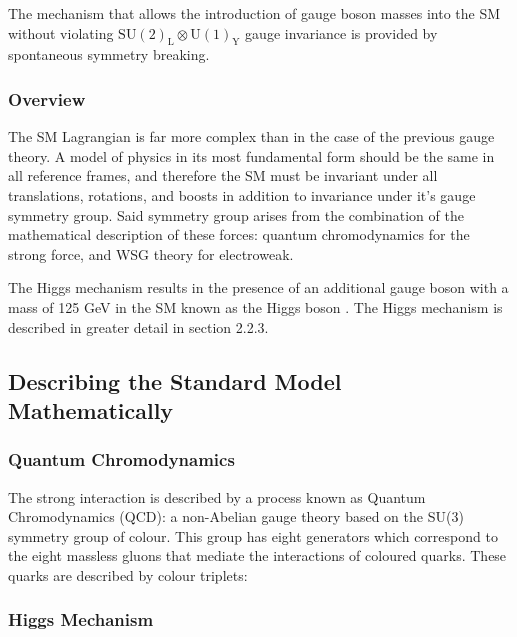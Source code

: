 \documentclass[12pt,a4paper,epsf,portrait,times,epsfig]{report}
\begin{document}
	The mechanism that allows the introduction of gauge boson masses into the SM without violating $\mathrm{SU(2)}_{\mathrm{L}} \otimes \mathrm{U(1)}_{\mathrm{Y}}$ gauge invariance is provided by spontaneous symmetry breaking. 


	\newpage

	\subsubsection{Overview}

	The SM Lagrangian is far more complex than in the case of the previous gauge theory. A model of physics in its most fundamental form should be the same in all reference frames, and therefore the SM must be invariant under all translations, rotations, and boosts in addition to invariance under it's gauge symmetry group. Said symmetry group arises from the combination of the mathematical description of these forces: quantum chromodynamics for the strong force, and WSG theory for electroweak.



	

 		The Higgs mechanism results in the presence of an additional gauge boson with a mass of 125 GeV in the SM known as the Higgs boson \cite{DiscoHiggsATLAS}\cite{DiscoHiggsCMS}. The Higgs mechanism is described in greater detail in section 2.2.3. \par

		\subsection{Describing the Standard Model Mathematically}
		
		\subsubsection{Quantum Chromodynamics}
		
		The strong interaction is described by a process known as Quantum Chromodynamics (QCD)\cite{Article:PDG}\cite{Article:QCDPrimer}: a non-Abelian gauge theory based on the SU(3) symmetry group of colour. This group has eight generators which correspond to the eight massless gluons that mediate the interactions of coloured quarks. These quarks are described by colour triplets:
		
		\subsubsection{Higgs Mechanism}
		
\end{document}

